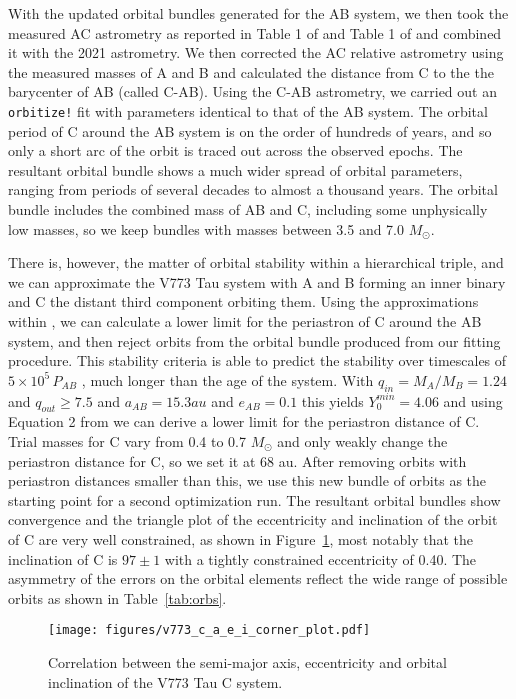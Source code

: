 \documentclass{aa}
\begin{document}
With the updated orbital bundles generated for the AB system, we then took the measured AC astrometry as reported in Table 1 of \citet{Duchene03} and Table 1 of \citet{Boden12} and combined it with the 2021 astrometry.
%
We then corrected the AC relative astrometry using the measured masses of A and B and calculated the distance from C to the the barycenter of AB (called C-AB).
%
Using the C-AB astrometry, we carried out an {\tt orbitize!} fit with parameters identical to that of the AB system.
%
The orbital period of C around the AB system is on the order of hundreds of years, and so only a short arc of the orbit is traced out across the observed epochs.
%
The resultant orbital bundle shows a much wider spread of orbital parameters, ranging from periods of several decades to almost a thousand years.
%
The orbital bundle includes the combined mass of AB and C, including some unphysically low masses, so we keep bundles with masses between 3.5 and 7.0 $M_\odot$.

There is, however, the matter of orbital stability within a hierarchical triple, and we can approximate the V773 Tau system with A and B forming an inner binary and C the distant third component orbiting them.
%
Using the approximations within \citet{Eggleton95}, we can calculate a lower limit for the periastron of C around the AB system, and then reject orbits from the orbital bundle produced from our fitting procedure. This stability criteria is able to predict the stability over timescales of $5\times 10^5\,P_{AB}$ \citep{He2018}, much longer than the age of the system.
% 
With $q_{in}=M_A/M_B=1.24$ and $q_{out}\geq 7.5$ and $a_{AB}=15.3au$ and $e_{AB} = 0.1$ this yields $Y^{min}_0=4.06$ and using Equation 2 from \citet{Eggleton95} we can derive a lower limit for the periastron distance of C.
%
Trial masses for C vary from 0.4 to 0.7 $M_\odot$ and only weakly change the periastron distance for C, so we set it at 68 au.
%
After removing orbits with periastron distances smaller than this, we use this new bundle of orbits as the starting point for a second optimization run.
%
The resultant orbital bundles show convergence and the triangle plot of the eccentricity and inclination of the orbit of C are very well constrained, as shown in Figure~\ref{fig:v773caei}, most notably that the inclination of C is $97\pm1$\degr{} with a tightly constrained eccentricity of 0.40.
%
The asymmetry of the errors on the orbital elements reflect the wide range of possible orbits as shown in Table~\ref{tab:orbs}.

\begin{figure}[ht]
\begin{center}
    \centering
    \texttt{[image: figures/v773\_c\_a\_e\_i\_corner\_plot.pdf]}
        \caption{Correlation between the semi-major axis, eccentricity and orbital inclination of the V773 Tau C system.
        }
    \label{fig:v773caei}

\end{center}
\end{figure}
\end{document}
